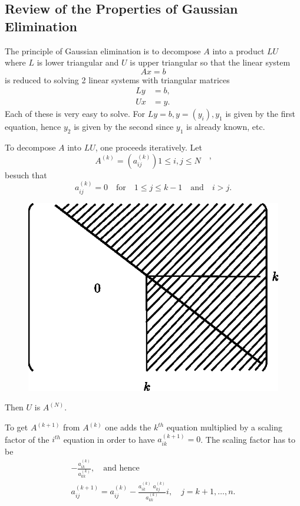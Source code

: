 \subsection{Review of the Properties of Gaussian
  Elimination} \label{chap4:sec1}
 The principle of Gaussian elimination is to decompose $A$ into a product $LU$ where $L$ is lower triangular and $U$ is upper triangular so that the linear system 
$$ 
Ax=b
$$
is reduced to solving 2 linear systems with triangular matrices 
\begin{align*}
Ly &= b,\\
Ux &= y.
\end{align*}
Each of these is very easy to solve. For $Ly=b, y=(y_i),y_1$ is given
by the first equation, hence $y_2$ is given by the second since $y_1$
is already known, etc.

To decompose $A$ into $LU$, one proceeds iteratively. Let 
$$
A^{(k)}=\left(a_{ij}^{(k)}\right)1\leq i, j\leq N\quad\text{'}
$$
be\pageoriginale such that 
$$
a_{ij}^{(k)}=0\quad\text{for}\quad 1\leq j\leq k-1\quad\text{and}\quad
i>j.
$$
\begin{figure}[H]
\centering
\includegraphics{figure/fig4.2.eps}
\caption{}\label{fig4.2}
\end{figure}

Then $U$ is $A^{(N)}$. 

To get $A^{(k+1)}$ from $A^{(k)}$ one adds the $k^{th}$ equation
multiplied by a scaling factor of the $i^{th}$ equation in order to
have $a_{ik}^{(k+1)}=0$. The scaling factor has to be 
\begin{equation}\label{chap4:eq4.13}
\begin{split}
-\frac{a_{ik}^{(k)}}{a_{kk}^{(k)}},\quad\text{and hence}\\
a_{ij}^{(k+1)}=a_{ij}^{(k)}-\frac{a_{ik}^{(k)}\;a_{kj}^{(k)}}
{a_{kk}^{(k)}} i,\quad j=k+1,\ldots,n.
\end{split}
\end{equation}

